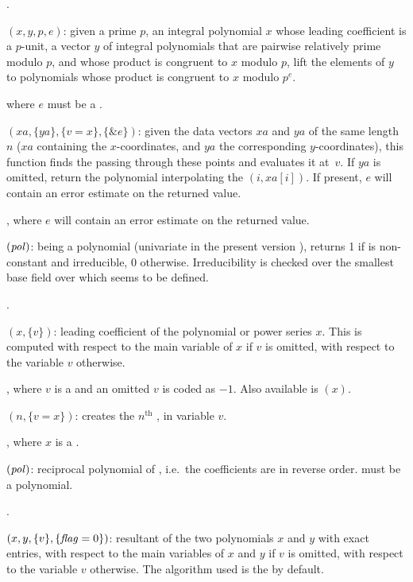 .

$(x, y, p, e)$: given a prime $p$, an integral
polynomial $x$ whose leading coefficient is a $p$-unit, a vector $y$ of
integral polynomials that are pairwise relatively prime modulo $p$, and whose
product is congruent to $x$ modulo $p$, lift the elements of $y$ to
polynomials whose product is congruent to $x$ modulo $p^e$.

 where $e$ must be a .

$(xa,\{ya\},\{v=x\},\{\&e\})$: given the data vectors
$xa$ and $ya$ of the same length $n$ ($xa$ containing the $x$-coordinates,
and $ya$ the corresponding $y$-coordinates), this function finds the
 passing through these points and evaluates it
at~$v$. If $ya$ is omitted, return the polynomial interpolating the
$(i,xa[i])$. If present, $e$ will contain an error estimate on the returned
value.

, where $e$ will contain an error estimate on the
returned value.

$(\hbox{\it pol\/})$:  being a polynomial
(univariate in the present version \vers), returns 1 if  is
non-constant and irreducible, 0 otherwise. Irreducibility is checked over
the smallest base field over which  seems to be defined.

.

$(x,\{v\})$: leading coefficient of the polynomial or
power series $x$. This is computed with respect to the main variable of $x$
if $v$ is omitted, with respect to the variable $v$ otherwise.

, where $v$ is a  and an omitted $v$ is coded as
$-1$. Also available is $(x)$.

$(n,\{v=x\})$: creates the $n^{\text{th}}$
, in variable $v$.

, where $x$ is a .

$(\hbox{\it pol\/})$: reciprocal polynomial of ,
i.e.~the coefficients are in reverse order.  must be a polynomial.

.

$(x,y,\{v\},\{\hbox{\it f\kern0pt lag\/}=0\})$: resultant of the two
polynomials $x$ and $y$ with exact entries, with respect to the main
variables of $x$ and $y$ if $v$ is omitted, with respect to the variable $v$
otherwise. The algorithm used is the  by default.

